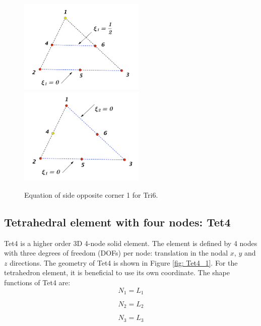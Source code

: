 \begin{figure}[h]
	\begin{center}
		\includegraphics[width=6cm,clip]{Tri6_2.pdf}		
		\includegraphics[width=6cm,clip]{Tri6_3.pdf}		
		\caption{Equation of side opposite corner 1 for Tri6.} \label{fig: Tri6_2}
		
	\end{center} 
\end{figure}


\subsection{Tetrahedral element with four nodes: Tet4}
Tet4 is a higher order 3D 4-node solid element. The element is defined by 4 nodes with three degrees of freedom (DOFs) per node: translation in the nodal $x$, $y$ and $z$ directions. The geometry of Tet4 is shown in Figure \ref{fig: Tet4_1}. For the tetrahedron element, it is beneficial to use its own coordinate. The shape functions of Tet4 are:
\begin{equation}
N_1 = L_1
\end{equation}

\begin{equation}
N_2 = L_2
\end{equation}

\begin{equation}
N_3 = L_3
\end{equation}

